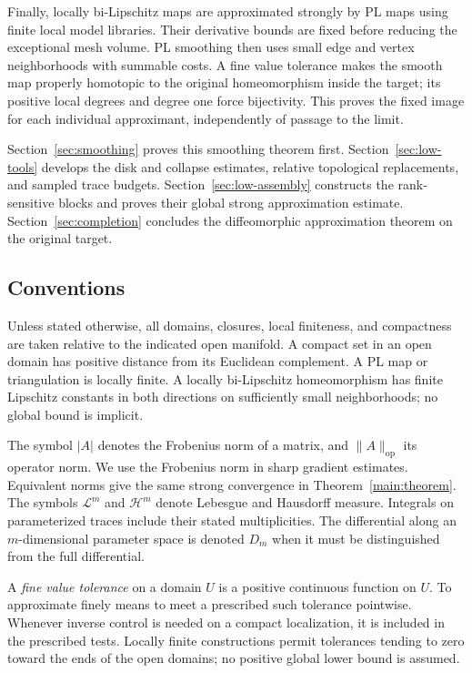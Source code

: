 \documentclass[11pt]{article}
\numberwithin{equation}{section}
\theoremstyle{definition}
\theoremstyle{remark}
\begin{document}
Finally, locally bi-Lipschitz maps are approximated strongly by PL
maps using finite local model libraries. Their derivative bounds are
fixed before reducing the exceptional mesh volume. PL smoothing
then uses small edge and vertex neighborhoods with summable costs.
A fine value tolerance makes the smooth map properly homotopic to
the original homeomorphism inside the target; its positive local
degrees and degree one force bijectivity. This proves the fixed
image for each individual approximant, independently of passage
to the limit.

Section~\ref{sec:smoothing} proves this smoothing theorem first.
Section~\ref{sec:low-tools} develops the disk and collapse estimates,
relative topological replacements, and sampled trace budgets.
Section~\ref{sec:low-assembly} constructs the rank-sensitive blocks
and proves their global strong approximation estimate.
Section~\ref{sec:completion} concludes the diffeomorphic
approximation theorem on the original target.

\subsection{Conventions}

Unless stated otherwise, all domains, closures, local finiteness, and compactness are taken relative to the indicated open manifold. A compact set in an open domain has positive distance from its Euclidean complement. A PL map or triangulation is locally finite. A locally bi-Lipschitz homeomorphism has finite Lipschitz constants in both directions on sufficiently small neighborhoods; no global bound is implicit.

The symbol $|A|$ denotes the Frobenius norm of a matrix, and $\|A\|_{\mathrm{op}}$ its operator norm. We use the Frobenius norm in sharp gradient estimates. Equivalent norms give the same strong convergence in Theorem~\ref{main:theorem}. The symbols $\mathcal L^m$ and $\mathcal H^m$ denote Lebesgue and Hausdorff measure. Integrals on parameterized traces include their stated multiplicities. The differential along an $m$-dimensional parameter space is denoted $D_m$ when it must be distinguished from the full differential.

A \emph{fine value tolerance} on a domain $U$ is a positive continuous function on $U$. To approximate finely means to meet a prescribed such tolerance pointwise. Whenever inverse control is needed on a compact localization, it is included in the prescribed tests. Locally finite constructions permit tolerances tending to zero toward the ends of the open domains; no positive global lower bound is assumed.
\end{document}
